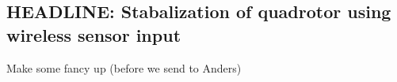 



\subsection{HEADLINE: Stabalization of quadrotor using wireless sensor input}
Make some fancy up (before we send to Anders)

